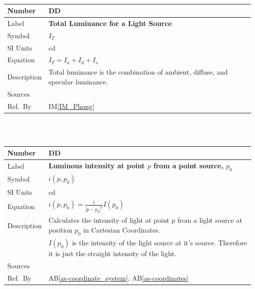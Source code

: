 \documentclass[12pt]{article}
\newcommand{\colAwidth}{0.13\textwidth}
\newcommand{\colBwidth}{0.82\textwidth}
\newcounter{defnum} %
\newcounter{datadefnum} %
\newcommand{\aBref}[1]{AB\ref{#1}}
\newcommand{\iref}[1]{IM\ref{#1}}
\begin{document}
~\newline

\noindent
\begin{minipage}{\textwidth}
	\renewcommand*{\arraystretch}{1.5}
	\begin{tabular}{| p{\colAwidth} | p{\colBwidth}|}
		\hline
		\rowcolor[gray]{0.9}
		Number& DD{datadefnum}\thedatadefnum 
		\label{DD_Intensity_Total}\\
		\hline
		Label& \bf Total Luminance for a Light Source\\
		\hline
		Symbol &$I_{T}$\\
		\hline
		SI Units & cd\\
		\hline
		Equation&$I_{T} = I_{a} + I_{d} + I_{s}$ \\
		\hline
		Description & Total luminance is the combination of ambient, diffuse, 
		and specular luminance.
		\\
		\hline
		Sources& \cite{shreiner2012}\\
		\hline
		Ref.\ By & \iref{IM_Phong} \\
		\hline
	\end{tabular}
\end{minipage}\\

~\newline

\noindent
\begin{minipage}{\textwidth}
	\renewcommand*{\arraystretch}{1.5}
	\begin{tabular}{| p{\colAwidth} | p{\colBwidth}|}
		\hline
		\rowcolor[gray]{0.9}
		Number& DD{datadefnum}\thedatadefnum 
		\label{DD_Intensity_PointSource_Distance}\\
		\hline
		Label& \bf Luminous intensity at point $p$ from a point source, 
		$p_{0}$\\
		\hline
		Symbol &$i(p, p_{0})$\\
		\hline
		SI Units & cd\\
		\hline
		Equation&$i(p, p_{0}) = \frac{1}{|p-p_{0}|^2} I(p_{0})$\\
		\hline
		Description & Calculates the intensity of light at point $p$ from a 
		light source at position $p_{0}$ in Cartesian Coordinates.\\
		& $I(p_{0})$ is the intensity of the light source at it's source. 
		Therefore it is just the straight intensity of the light.\\
		\hline
		Sources& \cite{Lengyel2003}\\
		\hline
		Ref.\ By & \aBref{as-coordinate_system}, \aBref{as-coordinates} \\
		\hline
	\end{tabular}
\end{minipage}\\
\end{document}

